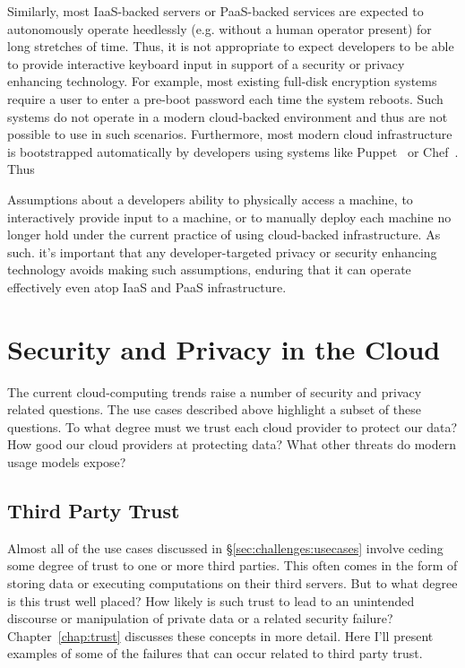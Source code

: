 Similarly, most IaaS-backed servers or PaaS-backed services are
expected to autonomously operate heedlessly (e.g. without a human
operator present) for long stretches of time. Thus, it is not
appropriate to expect developers to be able to provide interactive
keyboard input in support of a security or privacy enhancing
technology. For example, most existing full-disk encryption systems
require a user to enter a pre-boot password each time the system
reboots. Such systems do not operate in a modern cloud-backed
environment and thus are not possible to use in such
scenarios. Furthermore, most modern cloud infrastructure is
bootstrapped automatically by developers using systems like
Puppet~\cite{puppet} or Chef~\cite{chef}. Thus

Assumptions about a developers ability to physically access a machine,
to interactively provide input to a machine, or to manually deploy
each machine no longer hold under the current practice of using
cloud-backed infrastructure. As such. it's important that any
developer-targeted privacy or security enhancing technology avoids
making such assumptions, enduring that it can operate effectively even
atop IaaS and PaaS infrastructure.

\section{Security and Privacy in the Cloud}

The current cloud-computing trends raise a number of security and
privacy related questions. The use cases described above highlight a
subset of these questions. To what degree must we trust each cloud
provider to protect our data? How good our cloud providers at
protecting data? What other threats do modern usage models expose?

\subsection{Third Party Trust}

Almost all of the use cases discussed in
\S\ref{sec:challenges:usecases} involve ceding some degree of trust to
one or more third parties. This often comes in the form of storing
data or executing computations on their third servers. But to what
degree is this trust well placed? How likely is such trust to lead to
an unintended discourse or manipulation of private data or a related
security failure? Chapter~\ref{chap:trust} discusses these concepts in
more detail. Here I'll present examples of some of the failures that
can occur related to third party trust.

